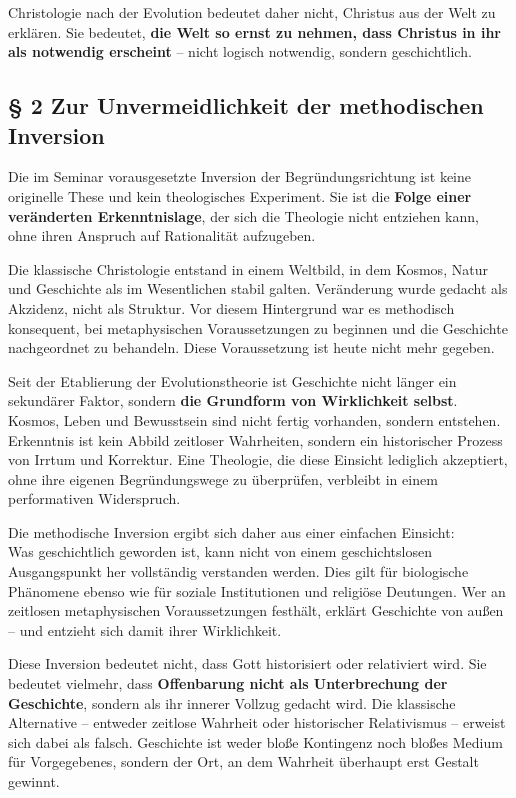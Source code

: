 \documentclass[
]{article}
\begin{document}
Christologie nach der Evolution bedeutet daher nicht, Christus aus der Welt zu erklären. Sie bedeutet, \textbf{die Welt so ernst zu nehmen, dass Christus in ihr als notwendig erscheint} -- nicht logisch notwendig, sondern geschichtlich.

\subsection{\texorpdfstring{\textbf{§ 2 Zur Unvermeidlichkeit der methodischen Inversion}}{§ 2 Zur Unvermeidlichkeit der methodischen Inversion}}\label{zur-unvermeidlichkeit-der-methodischen-inversion}

Die im Seminar vorausgesetzte Inversion der Begründungsrichtung ist keine originelle These und kein theologisches Experiment. Sie ist die \textbf{Folge einer veränderten Erkenntnislage}, der sich die Theologie nicht entziehen kann, ohne ihren Anspruch auf Rationalität aufzugeben.

Die klassische Christologie entstand in einem Weltbild, in dem Kosmos, Natur und Geschichte als im Wesentlichen stabil galten. Veränderung wurde gedacht als Akzidenz, nicht als Struktur. Vor diesem Hintergrund war es methodisch konsequent, bei metaphysischen Voraussetzungen zu beginnen und die Geschichte nachgeordnet zu behandeln. Diese Voraussetzung ist heute nicht mehr gegeben.

Seit der Etablierung der Evolutionstheorie ist Geschichte nicht länger ein sekundärer Faktor, sondern \textbf{die Grundform von Wirklichkeit selbst}. Kosmos, Leben und Bewusstsein sind nicht fertig vorhanden, sondern entstehen. Erkenntnis ist kein Abbild zeitloser Wahrheiten, sondern ein historischer Prozess von Irrtum und Korrektur. Eine Theologie, die diese Einsicht lediglich akzeptiert, ohne ihre eigenen Begründungswege zu überprüfen, verbleibt in einem performativen Widerspruch.

Die methodische Inversion ergibt sich daher aus einer einfachen Einsicht:\\
Was geschichtlich geworden ist, kann nicht von einem geschichtslosen Ausgangspunkt her vollständig verstanden werden. Dies gilt für biologische Phänomene ebenso wie für soziale Institutionen und religiöse Deutungen. Wer an zeitlosen metaphysischen Voraussetzungen festhält, erklärt Geschichte von außen -- und entzieht sich damit ihrer Wirklichkeit.

Diese Inversion bedeutet nicht, dass Gott historisiert oder relativiert wird. Sie bedeutet vielmehr, dass \textbf{Offenbarung nicht als Unterbrechung der Geschichte}, sondern als ihr innerer Vollzug gedacht wird. Die klassische Alternative -- entweder zeitlose Wahrheit oder historischer Relativismus -- erweist sich dabei als falsch. Geschichte ist weder bloße Kontingenz noch bloßes Medium für Vorgegebenes, sondern der Ort, an dem Wahrheit überhaupt erst Gestalt gewinnt.
\end{document}
